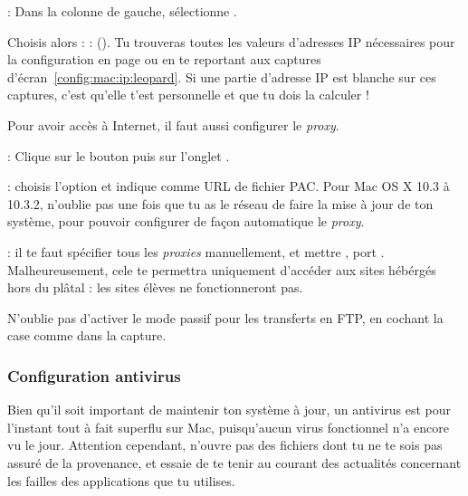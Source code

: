  : Dans la colonne de gauche, s\'electionne .

Choisis alors  :%
 :  (). Tu trouveras toutes les valeurs d'adresses IP n\'ecessaires pour la configuration en page \pageref{calcul_ip} ou en te reportant aux captures d'\'ecran~\ref{config:mac:ip:leopard}. Si une partie d'adresse IP est blanche sur ces captures, c'est qu'elle t'est personnelle et que tu dois la calculer !


  
  



Pour avoir acc\`es \`a  Internet, il faut aussi configurer le \emph{proxy}.

 : Clique sur le bouton  puis sur l'onglet .


 :  choisis l'option  et indique  comme URL de fichier PAC. Pour Mac OS X 10.3 \`a  10.3.2, n'oublie pas une fois que tu as le r\'eseau de faire la mise \`a  jour de ton syst\`eme, pour pouvoir configurer de fa\c con automatique le \emph{proxy}.

 : il te faut sp\'ecifier tous les
\emph{proxies} manuellement, et mettre , port . Malheureusement, cele te permettra uniquement d'acc\'eder aux sites h\'eb\'erg\'es hors du pl\^atal : les sites \'el\`eves ne fonctionneront pas.


N'oublie pas d'activer le mode passif pour les transferts en FTP, en cochant la case comme dans la capture.

\subsubsection{Configuration antivirus}

Bien qu'il soit important de maintenir ton syst\`eme \`a  jour, un antivirus est pour l'instant tout \`a  fait superflu sur Mac,
puisqu'aucun virus fonctionnel n'a encore vu le jour. Attention cependant, n'ouvre pas des fichiers dont tu ne te sois pas assur\'e de la provenance,
et essaie de te tenir au courant des actualit\'es concernant les failles des applications que tu utilises.


